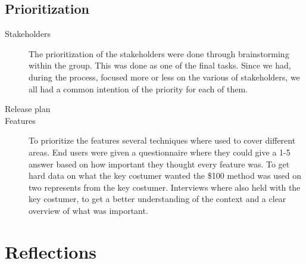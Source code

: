 \documentclass[10pt,a4paper]{article}
\begin{document}
\subsection{Prioritization}
\begin{description}
\item[Stakeholders] 
The prioritization of the stakeholders were done through brainstorming within the group. This was done as one of the final tasks. Since we had, during the process, focused more or less on the various of stakeholders, we all had a common intention of the priority for each of them.   

\item[Release plan]

\item[Features] To prioritize the features several techniques where used to cover different areas. End users were given a questionnaire where they could give a 1-5 answer based on how important they thought every feature was. To get hard data on what the key costumer wanted the \$100 method was used on two represents from the key costumer. Interviews where also held with the key costumer, to get a better understanding of the context and a clear overview of what was important.
\end{description}



\section{Reflections}
\label{sec:ref}
\end{document}
